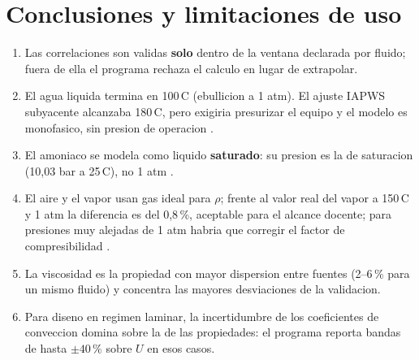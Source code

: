 \documentclass[11pt,a4paper]{article}
\begin{document}
\section{Conclusiones y limitaciones de uso}
\begin{enumerate}[leftmargin=1.4em]
\item Las correlaciones son validas \textbf{solo} dentro de la ventana
declarada por fluido; fuera de ella el programa rechaza el calculo en lugar
de extrapolar.
\item El agua liquida termina en 100\,\textdegree C (ebullicion a 1 atm). El
ajuste IAPWS subyacente alcanzaba 180\,\textdegree C, pero exigiria
presurizar el equipo y el modelo es monofasico, sin presion de operacion
\cite{iapws-if97}.
\item El amoniaco se modela como liquido \textbf{saturado}: su presion es la
de saturacion (10,03 bar a 25\,\textdegree C), no 1 atm \cite{ashrae}.
\item El aire y el vapor usan gas ideal para $\rho$; frente al valor real del
vapor a 150\,\textdegree C y 1 atm la diferencia es del 0,8\,\%, aceptable
para el alcance docente; para presiones muy alejadas de 1 atm habria que
corregir el factor de compresibilidad \cite{nist}.
\item La viscosidad es la propiedad con mayor dispersion entre fuentes
(2--6\,\% para un mismo fluido) y concentra las mayores desviaciones de la
validacion.
\item Para diseno en regimen laminar, la incertidumbre de los coeficientes de
conveccion domina sobre la de las propiedades: el programa reporta bandas de
hasta $\pm 40\,\%$ sobre $U$ en esos casos.
\end{enumerate}
\end{document}
